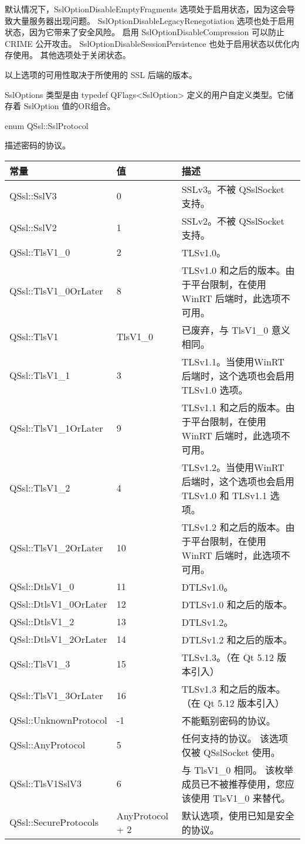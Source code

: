 默认情况下，SslOptionDisableEmptyFragments 选项处于启用状态，因为这会导致大量服务器出现问题。 
SslOptionDisableLegacyRenegotiation 选项也处于启用状态，因为它带来了安全风险。 
启用 SslOptionDisableCompression 可以防止 CRIME 公开攻击。 
SslOptionDisableSessionPersistence 也处于启用状态以优化内存使用。 
其他选项处于关闭状态。

\begin{notice}
以上选项的可用性取决于所使用的 SSL 后端的版本。
\end{notice}

SslOptions 类型是由 typedef QFlags<SslOption> 定义的用户自定义类型。它储存着 SslOption 值的OR组合。

enum QSsl::SslProtocol

描述密码的协议。

\begin{longtable}[l]{|l|l|m{20em}|}
\hline
常量 	&值& 	描述 \\ 
\hline
QSsl::SslV3 &	0 &	SSLv3。不被 QSslSocket 支持。\\
\hline
QSsl::SslV2 &	1 &	SSLv2。不被 QSslSocket 支持。\\
\hline
QSsl::TlsV1\_0 &	2 &	TLSv1.0。\\
\hline
QSsl::TlsV1\_0OrLater &	8 &	TLSv1.0 和之后的版本。由于平台限制，在使用 WinRT 后端时，此选项不可用。 \\
\hline
QSsl::TlsV1 	&TlsV1\_0 &	已废弃，与 TlsV1\_0 意义相同。\\
\hline
QSsl::TlsV1\_1 &	3 &	TLSv1.1。当使用WinRT 后端时，这个选项也会启用 TLSv1.0 选项。\\
\hline
QSsl::TlsV1\_1OrLater &	9 &	TLSv1.1 和之后的版本。由于平台限制，在使用 WinRT 后端时，此选项不可用。\\
\hline
QSsl::TlsV1\_2 &	4 &	TLSv1.2。当使用WinRT 后端时，这个选项也会启用 TLSv1.0 和 TLSv1.1 选项。\\
\hline
QSsl::TlsV1\_2OrLater &	10 &	TLSv1.2 和之后的版本。由于平台限制，在使用 WinRT 后端时，此选项不可用。\\
\hline
QSsl::DtlsV1\_0 &	11 	&DTLSv1.0。\\
\hline
QSsl::DtlsV1\_0OrLater& 	12 	&DTLSv1.0 和之后的版本。\\
\hline
QSsl::DtlsV1\_2 &	13& 	DTLSv1.2。\\
\hline
QSsl::DtlsV1\_2OrLater &	14 &	DTLSv1.2 和之后的版本。\\
\hline
QSsl::TlsV1\_3 	&15 &	TLSv1.3。（在 Qt 5.12 版本引入）\\
\hline
QSsl::TlsV1\_3OrLater &	16 &	TLSv1.3 和之后的版本。（在 Qt 5.12 版本引入）\\
\hline
QSsl::UnknownProtocol &	-1 &	不能甄别密码的协议。\\
\hline
QSsl::AnyProtocol &	5 &	任何支持的协议。 该选项仅被 QSslSocket 使用。\\
\hline
QSsl::TlsV1SslV3 &	6 &	与 TlsV1\_0 相同。 该枚举成员已不被推荐使用，您应该使用 TlsV1\_0 来替代。\\
\hline
QSsl::SecureProtocols 	&AnyProtocol + 2 &	默认选项，使用已知是安全的协议。\\
\hline
\end{longtable}


